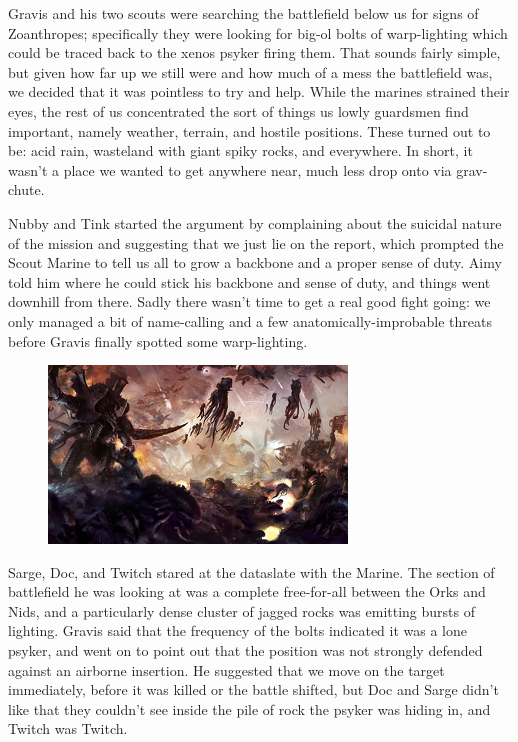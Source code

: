 Gravis and his two scouts were searching the battlefield below us for signs of Zoanthropes; 
specifically they were looking for big-ol bolts of warp-lighting which could be traced back to the xenos psyker firing them. 
That sounds fairly simple, but given how far up we still were and how much of a mess the battlefield was, we decided that it was pointless to try and help. 
While the marines strained their eyes, the rest of us concentrated the sort of things us lowly guardsmen find important, namely weather, terrain, and hostile positions. 
These turned out to be: 
acid rain, wasteland with giant spiky rocks, and everywhere. 
In short, it wasn't a place we wanted to get anywhere near, much less drop onto via grav-chute.

Nubby and Tink started the argument by complaining about the suicidal nature of the mission and suggesting that we just lie on the report, which prompted the Scout Marine to tell us all to grow a backbone and a proper sense of duty. 
Aimy told him where he could stick his backbone and sense of duty, and things went downhill from there. 
Sadly there wasn't time to get a real good fight going: 
we only managed a bit of name-calling and a few anatomically-improbable threats before Gravis finally spotted some warp-lighting.

\begin{figure}
	\begin{center}
		\includegraphics[width=\figwidth]{pics/12/35.png}
	\end{center}
\end{figure}
Sarge, Doc, and Twitch stared at the dataslate with the Marine. 
The section of battlefield he was looking at was a complete free-for-all between the Orks and Nids, and a particularly dense cluster of jagged rocks was emitting bursts of lighting. 
Gravis said that the frequency of the bolts indicated it was a lone psyker, and went on to point out that the position was not strongly defended against an airborne insertion. 
He suggested that we move on the target immediately, before it was killed or the battle shifted, but Doc and Sarge didn't like that they couldn't see inside the pile of rock the psyker was hiding in, and Twitch was Twitch.

